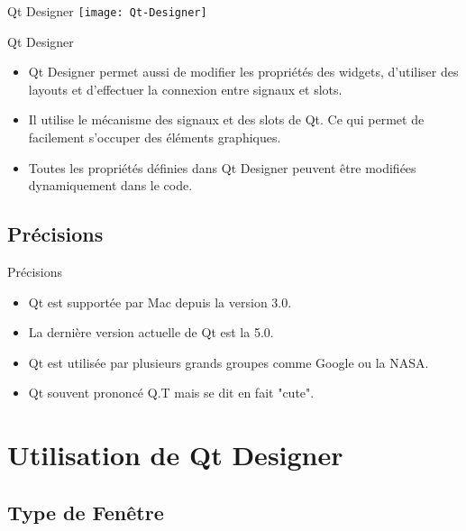 \documentclass{beamer}
\begin{document}
\begin{frame}{Qt Designer}
  \texttt{[image: Qt-Designer]}
\end{frame}   
   
\begin{frame}{Qt Designer}
  \begin{itemize}  
    \item {   
        Qt Designer permet aussi de modifier les propriétés des widgets, d'utiliser des layouts et d'effectuer la connexion entre signaux et slots.
    }
    \pause
    
    \item {
        Il utilise le mécanisme des signaux et des slots de Qt. Ce qui permet de facilement s'occuper des éléments graphiques.
    \pause
    }
    \item {
        Toutes les propriétés définies dans Qt Designer peuvent être modifiées dynamiquement dans le code. 
    }
    \end{itemize}
\end{frame}


\subsection{Précisions}

\begin{frame}{Précisions}
  \begin{itemize}
    \item {
        Qt est supportée par Mac depuis la version 3.0.
    }
    \item {
        La dernière version actuelle de Qt est la 5.0.
    }
    \item {
        Qt est utilisée par plusieurs grands groupes comme Google ou la NASA.
    }
    \item {
        Qt souvent prononcé Q.T mais se dit en fait "cute".
    }
    \end{itemize}
\end{frame}


\section{Utilisation de Qt Designer}

\subsection{Type de Fenêtre}
\end{document}
